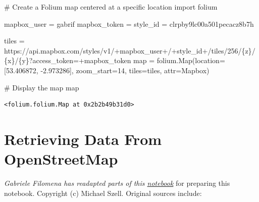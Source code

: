 \documentclass[
  letterpaper,
  DIV=11,
  numbers=noendperiod]{scrreprt}
\newenvironment{Shaded}{\begin{snugshade}}{\end{snugshade}}
\newcommand{\BuiltInTok}[1]{\textcolor[rgb]{0.00,0.23,0.31}{#1}}
\newcommand{\CommentTok}[1]{\textcolor[rgb]{0.37,0.37,0.37}{#1}}
\newcommand{\DecValTok}[1]{\textcolor[rgb]{0.68,0.00,0.00}{#1}}
\newcommand{\FloatTok}[1]{\textcolor[rgb]{0.68,0.00,0.00}{#1}}
\newcommand{\ImportTok}[1]{\textcolor[rgb]{0.00,0.46,0.62}{#1}}
\newcommand{\NormalTok}[1]{\textcolor[rgb]{0.00,0.23,0.31}{#1}}
\newcommand{\OperatorTok}[1]{\textcolor[rgb]{0.37,0.37,0.37}{#1}}
\newcommand{\SpecialCharTok}[1]{\textcolor[rgb]{0.37,0.37,0.37}{#1}}
\newcommand{\StringTok}[1]{\textcolor[rgb]{0.13,0.47,0.30}{#1}}
\begin{document}
\begin{Shaded}
\begin{Highlighting}[]
\CommentTok{\# Create a Folium map centered at a specific location}
\ImportTok{import}\NormalTok{ folium}

\NormalTok{mapbox\_user }\OperatorTok{=} \StringTok{\textquotesingle{}gabrif\textquotesingle{}}
\NormalTok{mapbox\_token }\OperatorTok{=} \StringTok{\textquotesingle{}\textquotesingle{}}
\NormalTok{style\_id }\OperatorTok{=} \StringTok{\textquotesingle{}clrpby9lc00a501pecacz8b7h\textquotesingle{}} 

\NormalTok{tiles }\OperatorTok{=} \StringTok{\textquotesingle{}https://api.mapbox.com/styles/v1/\textquotesingle{}}\OperatorTok{+}\NormalTok{mapbox\_user}\OperatorTok{+}\StringTok{\textquotesingle{}/\textquotesingle{}}\OperatorTok{+}\NormalTok{style\_id}\OperatorTok{+}\StringTok{\textquotesingle{}/tiles/256/}\SpecialCharTok{\{z\}}\StringTok{/}\SpecialCharTok{\{x\}}\StringTok{/}\SpecialCharTok{\{y\}}\StringTok{?access\_token=\textquotesingle{}}\OperatorTok{+}\NormalTok{mapbox\_token}
\BuiltInTok{map} \OperatorTok{=}\NormalTok{ folium.Map(location}\OperatorTok{=}\NormalTok{[}\FloatTok{53.406872}\NormalTok{, }\OperatorTok{{-}}\FloatTok{2.973286}\NormalTok{], zoom\_start}\OperatorTok{=}\DecValTok{14}\NormalTok{,}
\NormalTok{               tiles}\OperatorTok{=}\NormalTok{tiles,}
\NormalTok{               attr}\OperatorTok{=}\StringTok{\textquotesingle{}Mapbox\textquotesingle{}}\NormalTok{)}

\CommentTok{\# Display the map}
\BuiltInTok{map}
\end{Highlighting}
\end{Shaded}

\begin{verbatim}
<folium.folium.Map at 0x2b2b49b31d0>
\end{verbatim}


\hypertarget{retrieving-data-from-openstreetmap}{%
\chapter{Retrieving Data From
OpenStreetMap}\label{retrieving-data-from-openstreetmap}}

\emph{Gabriele Filomena has readapted parts of this
\href{https://github.com/mszell/geospatialdatascience/blob/main/unit08_openstreetmap/lecture08.ipynb}{notebook}}
for preparing this notebook. Copyright (c) Michael Szell. Original
sources include:
\end{document}
